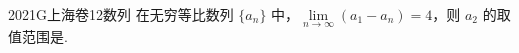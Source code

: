 
\begin{problem}{2021}{G}{上海卷}{12}{数列}
在无穷等比数列 $\{a_n\}$ 中，$\lim\limits_{n\to\infty}(a_1-a_n)=4$，则 $a_2$ 的取值范围是\underline{\hspace{4em}}.
\end{problem}